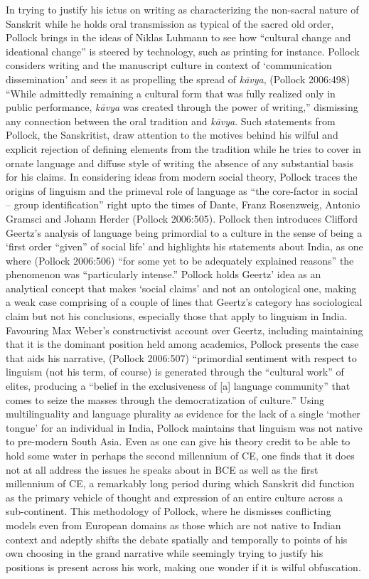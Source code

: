 In trying to justify his ictus on writing as characterizing the non-sacral nature of Sanskrit while he holds oral transmission as typical of the sacred old order, Pollock brings in the ideas of Niklas Luhmann to see how “cultural change and ideational change” is steered by technology, such as printing for instance. Pollock considers writing and the manuscript culture in context of ‘communication dissemination’ and sees it as propelling the spread of \textit{kāvya}, (Pollock 2006:498) “While admittedly remaining a cultural form that was fully realized only in public performance, \textit{kāvya} was created through the power of writing,” dismissing any connection between the oral tradition and \textit{kāvya}. Such statements from Pollock, the Sanskritist, draw attention to the motives behind his wilful and explicit rejection of defining elements from the tradition while he tries to cover in ornate language and diffuse style of writing the absence of any substantial basis for his claims. In considering ideas from modern social theory, Pollock traces the origins of linguism and the primeval role of language as “the core-factor in social – group identification” right upto the times of Dante, Franz Rosenzweig, Antonio Gramsci and Johann Herder (Pollock 2006:505). Pollock then introduces Clifford Geertz’s analysis of language being primordial to a culture in the sense of being a ‘first order “given” of social life’ and highlights his statements about India, as one where (Pollock 2006:506) “for some yet to be adequately explained reasons” the phenomenon was “particularly intense.” Pollock holds Geertz’ idea as an analytical concept that makes ‘social claims’ and not an ontological one, making a weak case comprising of a couple of lines that Geertz’s category has sociological claim but not his conclusions, especially those that apply to linguism in India. Favouring Max Weber’s constructivist account over Geertz, including maintaining that it is the dominant position held among academics, Pollock presents the case that aids his narrative, (Pollock 2006:507) “primordial sentiment with respect to linguism (not his term, of course) is generated through the “cultural work” of elites, producing a “belief in the exclusiveness of [a] language community” that comes to seize the masses through the democratization of culture.” Using multilinguality and language plurality as evidence for the lack of a single ‘mother tongue’ for an individual in India, Pollock maintains that linguism was not native to pre-modern South Asia. Even as one can give his theory credit to be able to hold some water in perhaps the second millennium of CE, one finds that it does not at all address the issues he speaks about in BCE as well as the first millennium of CE, a remarkably long period during which Sanskrit did function as the primary vehicle of thought and expression of an entire culture across a sub-continent. This methodology of Pollock, where he dismisses conflicting models even from European domains as those which are not native to Indian context and adeptly shifts the debate spatially and temporally to points of his own choosing in the grand narrative while seemingly trying to justify his positions is present across his work, making one wonder if it is wilful obfuscation.

